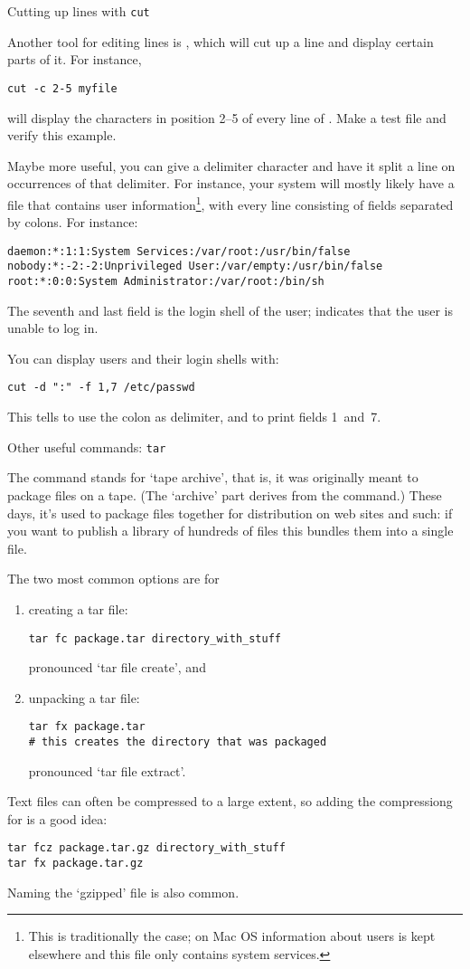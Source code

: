  {Cutting up lines with \protect\texttt{cut}}

Another tool for editing lines is , which will cut up a line
and display certain parts of it. For instance,
\begin{verbatim}
cut -c 2-5 myfile
\end{verbatim}
will display the characters in position 2--5 of every line of
. Make a test file and verify this example.

Maybe more useful, you can give  a delimiter character and have
it split a line on occurrences of that delimiter. For instance, your system
will mostly likely have a file  that contains user
information\footnote{This is traditionally the case; on Mac OS
  information about users is kept elsewhere and this file only
  contains system services.}, with every line consisting of fields
separated by colons. For instance:
\begin{verbatim}
daemon:*:1:1:System Services:/var/root:/usr/bin/false
nobody:*:-2:-2:Unprivileged User:/var/empty:/usr/bin/false
root:*:0:0:System Administrator:/var/root:/bin/sh
\end{verbatim}
The seventh and last field is the login shell of the user;
 indicates that the user is unable to log in.

You can display users and their login shells with:
\begin{verbatim}
cut -d ":" -f 1,7 /etc/passwd
\end{verbatim}
This tells  to use the colon as delimiter, and to print fields
1~and~7.

 {Other useful commands: \protect\texttt{tar}}

The  command stands for `tape archive',
that is, it was originally meant to package files on a tape.
(The `archive' part derives from the  command.)
These days, it's used to package files together for distribution
on web sites and such: if you want to publish a library of hundreds of files
this bundles them into a single file.

The two most common options are for 
\begin{enumerate}
\item creating a tar file:
\begin{verbatim}
tar fc package.tar directory_with_stuff
\end{verbatim}
pronounced `tar file create', and
\item unpacking a tar file:
\begin{verbatim}
tar fx package.tar
# this creates the directory that was packaged
\end{verbatim}
pronounced `tar file extract'.
\end{enumerate}
Text files can often be compressed to a large extent, so
adding the  compressiong for 
is a good idea:
\begin{verbatim}
tar fcz package.tar.gz directory_with_stuff
tar fx package.tar.gz
\end{verbatim}
Naming the `gzipped' file 
is also common.

